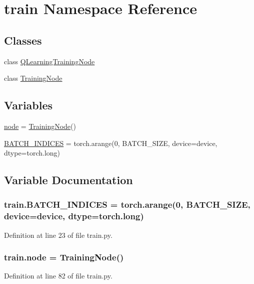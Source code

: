 \hypertarget{namespacetrain}{}\section{train Namespace Reference}
\label{namespacetrain}
\subsection*{Classes}
\begin{DoxyCompactItemize}
\item 
class \hyperlink{classtrain_1_1_q_learning_training_node}{Q\+Learning\+Training\+Node}
\item 
class \hyperlink{classtrain_1_1_training_node}{Training\+Node}
\end{DoxyCompactItemize}
\subsection*{Variables}
\begin{DoxyCompactItemize}
\item 
\hyperlink{namespacetrain_a7c68a6981d3c74c76920e856fc7c2419}{node} = \hyperlink{classtrain_1_1_training_node}{Training\+Node}()
\item 
\hyperlink{namespacetrain_ab5b44727ca7567b7191d18956f4c4e64}{B\+A\+T\+C\+H\+\_\+\+I\+N\+D\+I\+C\+ES} = torch.\+arange(0, B\+A\+T\+C\+H\+\_\+\+S\+I\+ZE, device=device, dtype=torch.\+long)
\end{DoxyCompactItemize}


\subsection{Variable Documentation}
\subsubsection[{\texorpdfstring{B\+A\+T\+C\+H\+\_\+\+I\+N\+D\+I\+C\+ES}{BATCH_INDICES}}]{\setlength{\rightskip}{0pt plus 5cm}train.\+B\+A\+T\+C\+H\+\_\+\+I\+N\+D\+I\+C\+ES = torch.\+arange(0, B\+A\+T\+C\+H\+\_\+\+S\+I\+ZE, device=device, dtype=torch.\+long)}\hypertarget{namespacetrain_ab5b44727ca7567b7191d18956f4c4e64}{}\label{namespacetrain_ab5b44727ca7567b7191d18956f4c4e64}


Definition at line 23 of file train.\+py.

\subsubsection[{\texorpdfstring{node}{node}}]{\setlength{\rightskip}{0pt plus 5cm}train.\+node = {\bf Training\+Node}()}\hypertarget{namespacetrain_a7c68a6981d3c74c76920e856fc7c2419}{}\label{namespacetrain_a7c68a6981d3c74c76920e856fc7c2419}


Definition at line 82 of file train.\+py.

